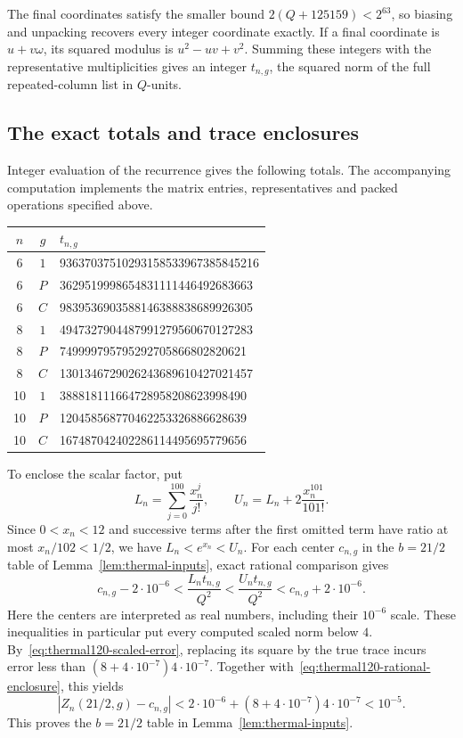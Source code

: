 The final coordinates satisfy the smaller bound
$2(Q+125159)<2^{63}$, so biasing and unpacking recovers every integer
coordinate exactly.  If a final coordinate is $u+v\omega$, its squared
modulus is $u^2-uv+v^2$.  Summing these integers with the representative
multiplicities gives an integer $t_{n,g}$, the squared norm of the full
repeated-column list in $Q$-units.

\subsection{The exact totals and trace enclosures}

Integer evaluation of the recurrence gives the following totals.
The accompanying computation implements the matrix entries,
representatives and packed operations specified above.
\begin{center}
\begin{tabular}{ccl}
\toprule
$n$&$g$&$t_{n,g}$\\
\midrule
6&$1$&93637037510293158533967385845216\\
6&$P$&3629519998654831111446492683663\\
6&$C$&9839536903588146388838689926305\\
8&$1$&4947327904487991279560670127283\\
8&$P$&749999795795292705866802820621\\
8&$C$&1301346729026243689610427021457\\
10&$1$&388818111664728958208623998490\\
10&$P$&120458568770462253326886628639\\
10&$C$&167487042402286114495695779656\\
\bottomrule
\end{tabular}
\end{center}

To enclose the scalar factor, put
\[
 L_n=\sum_{j=0}^{100}\frac{x_n^j}{j!},\qquad
 U_n=L_n+2\frac{x_n^{101}}{101!}.
\]
Since $0<x_n<12$ and successive terms after the first omitted term
have ratio at most $x_n/102<1/2$, we have
$L_n<e^{x_n}<U_n$.
For each center $c_{n,g}$ in the $b=21/2$ table of
Lemma~\ref{lem:thermal-inputs}, exact rational comparison gives
\begin{equation}\label{eq:thermal120-rational-enclosure}
 c_{n,g}-2\cdot10^{-6}
 <\frac{L_n t_{n,g}}{Q^2}
 <\frac{U_n t_{n,g}}{Q^2}
 <c_{n,g}+2\cdot10^{-6}.
\end{equation}
Here the centers are interpreted as real numbers, including their
$10^{-6}$ scale.
These inequalities in particular put every computed scaled norm below
$4$.  By~\eqref{eq:thermal120-scaled-error}, replacing its square by the
true trace incurs error less than
$(8+4\cdot10^{-7})4\cdot10^{-7}$.
Together with~\eqref{eq:thermal120-rational-enclosure}, this yields
\[
 |Z_n(21/2,g)-c_{n,g}|
 <2\cdot10^{-6}+(8+4\cdot10^{-7})4\cdot10^{-7}
 <10^{-5}.
\]
This proves the $b=21/2$ table in Lemma~\ref{lem:thermal-inputs}.
